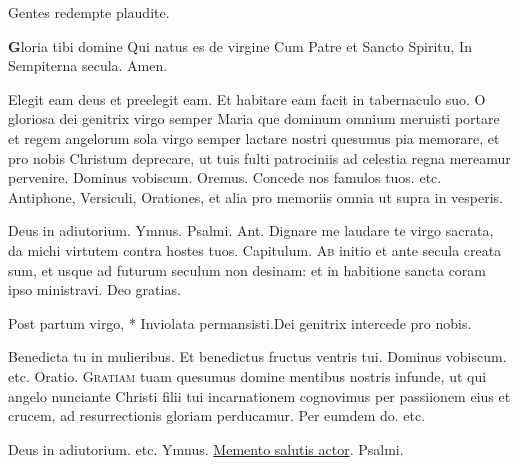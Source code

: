 \begin{multicols*}{2}
{Gentes redempte plaudite.
\par {\bfseries \color{Red} G}loria tibi domine
Qui natus es de virgine
Cum Patre et Sancto Spiritu,
In Sempiterna secula. Amen.
}
\newline \V Elegit eam deus et preelegit eam. \R Et habitare eam facit in tabernaculo suo.
 O gloriosa dei genitrix virgo semper Maria que dominum omnium meruisti portare et regem angelorum sola virgo semper lactare nostri quesumus pia memorare, et pro nobis Christum deprecare, ut tuis fulti patrociniis ad celestia regna mereamur pervenire. Dominus vobiscum. Oremus.
{\zallmancaps \color{Red} C}{oncede} nos famulos tuos. etc.
{\color{Red} Antiphone, Versiculi, Orationes, et alia pro memoriis omnia ut supra in vesperis.}
{\color{Red} }
\par \noindent Deus in adiutorium. {\color{Red} Ymnus.}
{\color{Red} Psalmi.}
{\color{Red} Ant.} Dignare me laudare te virgo sacrata, da michi virtutem contra hostes tuos. {\color{Red} Capitulum.}
\lettrine[lines=2]{\zallmancaps \color{Blue} A}{b} initio et ante secula creata sum, et usque ad futurum seculum non desinam: et in habitione sancta coram ipso ministravi. Deo gratias.
\begin{responsory-breve}
{Post partum virgo, * Inviolata permansisti.}{Dei genitrix intercede pro nobis.}
\end{responsory-breve}
\V Benedicta tu in mulieribus. \R Et benedictus fructus ventris tui. Dominus vobiscum. etc. {\color{Red} Oratio.}
\lettrine[lines=2]{\zallmancaps \color{Red} G}{ratiam} tuam quesumus domine mentibus nostris infunde, ut qui angelo nunciante Christi filii tui incarnationem cognovimus per passiionem eius et crucem, ad resurrectionis gloriam perducamur. Per eumdem do. etc.
{\color{Red} }
\par \noindent Deus in adiutorium. etc. {\color{Red} Ymnus.} \hyperlink{memento-salutis}{Memento salutis actor}. {\color{Red} Psalmi.}

\end{multicols*}
